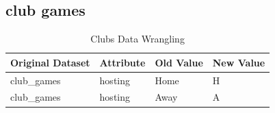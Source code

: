 \documentclass{Configuration_Files/PoliMi3i_thesis}
\begin{document}
\subsection{club games}
\begin{table}[ht]
	\centering
	\begin{tabular}{|l|l|l|l|}
		\hline
    \rowcolor{bluepoli!40}
		\textbf{Original Dataset} & \textbf{Attribute} & \textbf{Old Value} & \textbf{New Value} \\ \hline
		club\_games               & hosting            & Home               & H                  \\ \hline
		club\_games               & hosting            & Away               & A                  \\ \hline
	\end{tabular}
	\caption{Clubs Data Wrangling}
	\label{your-label-here}
\end{table}
\end{document}
